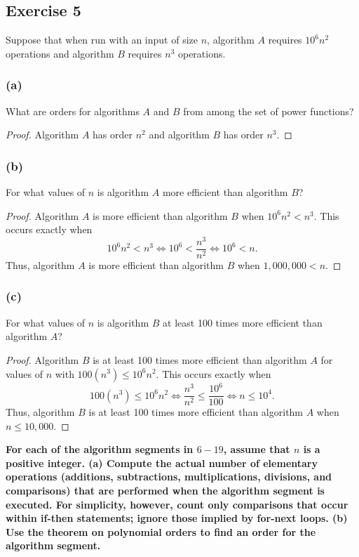 \documentclass[14pt]{extarticle}
\newcommand{\cy}{\color{cyan}}
\begin{document}
\subsection{Exercise 5}
Suppose that when run with an input of size \(n\), algorithm \(A\) requires \(10^6 n^2\) operations and algorithm \(B\)
requires \(n^3\) operations.

\subsubsection{(a)}
What are orders for algorithms \(A\) and \(B\) from among the set of power functions?

\begin{proof}
    Algorithm \(A\) has order \(n^2\) and algorithm \(B\) has order \(n^{3}\).
\end{proof}

\subsubsection{(b)}
For what values of \(n\) is algorithm \(A\) more efficient than algorithm \(B\)?

\begin{proof}
    Algorithm \(A\) is more efficient than algorithm \(B\) when \(10^6 n^2 < n^3\). This occurs exactly when
    \[
        10^6 n^2 < n^3 \iff 10^6 < \frac{n^3}{n^2} \iff 10^6 < n.
    \]
    Thus, algorithm \(A\) is more efficient than algorithm \(B\) when \(1,000,000 < n\).
\end{proof}

\subsubsection{(c)}
For what values of \(n\) is algorithm \(B\) at least 100 times more efficient than algorithm \(A\)?

\begin{proof}
    Algorithm \(B\) is at least 100 times more efficient than algorithm \(A\) for values of \(n\) with \(100(n^3) \leq
    10^6 n^2\). This occurs exactly when
    \[
        100(n^3) \leq 10^6 n^2 \iff \frac{n^3}{n^2} \leq \frac{10^6}{100} \iff n \leq 10^4.
    \]
    Thus, algorithm \(B\) is at least 100 times more efficient than algorithm \(A\) when \(n \leq 10,000\).
\end{proof}

{\bf \cy For each of the algorithm segments in \(6-19\), assume that \(n\) is a positive integer. (a) Compute the
actual number of elementary operations (additions, subtractions, multiplications, divisions, and comparisons)
that are performed when the algorithm segment is executed. For simplicity, however, count only comparisons that occur within
if-then statements; ignore those implied by for-next loops. (b) Use the theorem on polynomial orders to find an order for
the algorithm segment.}
\end{document}
